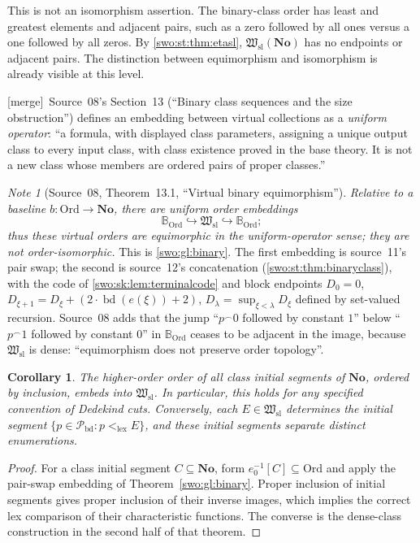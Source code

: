 \documentclass[11pt]{article}
\newtheorem{corollary}[corollary]{Corollary}
\theoremstyle{definition}
\theoremstyle{remark}
\newtheorem{note}[note]{Note}
\newcommand{\No}{\mathbf{No}}
\newcommand{\Ord}{\mathrm{Ord}}
\newcommand{\Hsl}{\mathfrak W_{\mathrm{sl}}}
\newcommand{\Pbd}{\mathcal P_{\mathrm{bd}}}
\newcommand{\BOrd}{\mathbb B_{\Ord}}
\newcommand{\lex}{\mathrm{lex}}
\newcommand{\bd}{\operatorname{bd}}
\newcommand{\emb}{\hookrightarrow}
\newcommand{\cat}{\mathbin{{}^\frown}}
\newcommand{\merge}{\textsf{[merge]}}
\begin{document}
This is not an isomorphism assertion. The binary-class order has least
and greatest elements and adjacent pairs, such as a zero followed by all
ones versus a one followed by all zeros. By
\cref{swo:st:thm:etasl}, $\Hsl(\No)$ has no endpoints or adjacent pairs.
The distinction between equimorphism and isomorphism is already visible
at this level.


\merge\ Source~08's Section~13 (``Binary class sequences and the size
obstruction'')\label{swo:sk:sec:binaryclass} defines an embedding between
virtual collections as a \emph{uniform operator}: ``a formula, with displayed
class parameters, assigning a unique output class to every input class, with
class existence proved in the base theory. It is not a new class whose
members are ordered pairs of proper classes.''

\begin{note}[Source~08, Theorem~13.1, ``Virtual binary equimorphism'']\label{swo:sk:thm:binaryclass}
\emph{Relative to a baseline $b:\Ord\to\No$, there are uniform order
embeddings}
\[
 \BOrd\emb\Hsl\emb\BOrd;
 \tag{S08.11}\label{swo:sk:eq:t11}
\]
\emph{thus these virtual orders are equimorphic in the uniform-operator sense;
they are not order-isomorphic.} This is \cref{swo:gl:binary}. The first
embedding is source~11's pair swap; the second is source~12's concatenation
(\cref{swo:st:thm:binaryclass}), with the code of
\cref{swo:sk:lem:terminalcode} and block endpoints
$D_0=0$, $D_{\xi+1}=D_\xi+(2\cdot\bd(e(\xi))+2)$, $D_\lambda=\sup_{\xi<\lambda}D_\xi$
defined by set-valued recursion. Source~08 adds that the jump
``$p\cat0$ followed by constant $1$'' below ``$p\cat1$ followed by constant
$0$'' in $\BOrd$ ceases to be adjacent in the image, because $\Hsl$ is dense:
``equimorphism does not preserve order topology''.
\end{note}

\begin{corollary}\label{swo:gl:cuts}
The higher-order order of all class initial segments of $\No$, ordered by
inclusion, embeds into $\Hsl$.  In particular, this holds for any specified
convention of Dedekind cuts.  Conversely, each $E\in\Hsl$ determines the
initial segment $\{p\in\Pbd:p<_{\lex}E\}$, and these initial segments
separate distinct enumerations.
\end{corollary}

\begin{proof}
For a class initial segment $C\subseteq\No$, form
$e_0^{-1}[C]\subseteq\Ord$ and apply the pair-swap embedding of
Theorem~\ref{swo:gl:binary}.  Proper inclusion of initial segments gives proper
inclusion of their inverse images, which implies the correct lex comparison
of their characteristic functions.  The converse is the dense-class
construction in the second half of that theorem.
\end{proof}
\end{document}
